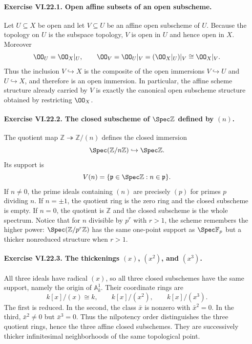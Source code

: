 
\paragraph{Exercise VI.22.1. Open affine subsets of an open subscheme.}
\begin{solution}
Let $U\subseteq X$ be open and let $V\subseteq U$ be an affine open subscheme of $U$.
Because the topology on $U$ is the subspace topology, $V$ is open in $U$ and hence open in
$X$.  Moreover
\[
 \OO_U=\OO_X|_U,
 \qquad
 \OO_V=\OO_U|_V=(\OO_X|_U)|_V\cong\OO_X|_V.
\]
Thus the inclusion $V\hookrightarrow X$ is the composite of the open immersions
$V\hookrightarrow U$ and $U\hookrightarrow X$, and therefore is an open immersion.  In
particular, the affine scheme structure already carried by $V$ is exactly the canonical open
subscheme structure obtained by restricting $\OO_X$.
\end{solution}

\paragraph{Exercise VI.22.2. The closed subscheme of $\Spec\mathbb Z$ defined by $(n)$.}
\begin{solution}
The quotient map $\mathbb Z\twoheadrightarrow\mathbb Z/(n)$ defines the closed immersion
\[
 \Spec(\mathbb Z/n\mathbb Z)\hookrightarrow\Spec\mathbb Z.
\]
Its support is
\[
 V(n)=\{\mathfrak p\in\Spec\mathbb Z:n\in\mathfrak p\}.
\]
If $n\neq0$, the prime ideals containing $(n)$ are precisely $(p)$ for primes $p$ dividing
$n$.  If $n=\pm1$, the quotient ring is the zero ring and the closed subscheme is empty.
If $n=0$, the quotient is $\mathbb Z$ and the closed subscheme is the whole spectrum.
Notice that for $n$ divisible by $p^r$ with $r>1$, the scheme remembers the higher power:
$\Spec(\mathbb Z/p^r\mathbb Z)$ has the same one-point support as
$\Spec\mathbb F_p$ but a thicker nonreduced structure when $r>1$.
\end{solution}

\paragraph{Exercise VI.22.3. The thickenings $(x)$, $(x^2)$, and $(x^3)$.}
\begin{solution}
All three ideals have radical $(x)$, so all three closed subschemes have the same support,
namely the origin of $\mathbb A^1_k$.  Their coordinate rings are
\[
 k[x]/(x)\cong k,\qquad
 k[x]/(x^2),\qquad
 k[x]/(x^3).
\]
The first is reduced.  In the second, the class $\bar x$ is nonzero with $\bar x^2=0$.
In the third, $\bar x^2\neq0$ but $\bar x^3=0$.  Thus the nilpotency order distinguishes
the three quotient rings, hence the three affine closed subschemes.  They are successively
thicker infinitesimal neighborhoods of the same topological point.
\end{solution}

